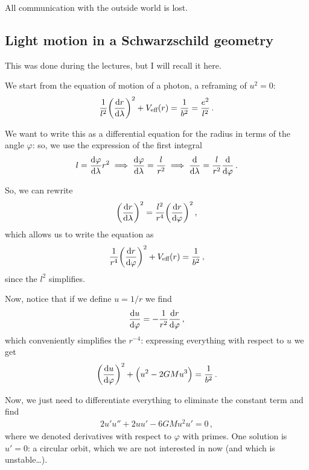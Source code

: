 \documentclass[main.tex]{subfiles}
\begin{document}
All communication with the outside world is lost. 

\subsection{Light motion in a Schwarzschild geometry}

This was done during the lectures, but I will recall it here. 

We start from the equation of motion of a photon, a reframing of \(u^2=0\): 
%
\begin{align}
  \frac{1}{l^2} \qty(\dv{r}{\lambda })^2 + V _{\text{eff}} (r) = \frac{1}{b^2} = \frac{e^2}{l^2}
\,.
\end{align}

We want to write this as a differential equation for the radius in terms of the angle \(\varphi \): so, we use the expression of the first integral 
%
\begin{align}
  l = \dv{\varphi }{\lambda } r^2 \implies \dv{\varphi }{\lambda } = \frac{l}{r^2} \implies \dv{}{\lambda } = \frac{l}{r^2} \dv{}{\varphi }
\,.
\end{align}
%

So, we can rewrite 
%
\begin{align}
  \qty(\dv{r}{\lambda })^2= \frac{l^2}{r^{4}} \qty(\dv{r}{\varphi })^2
\,,
\end{align}
%
which allows us to write the equation as 
%
\begin{align}
  \frac{1}{r^{4}} \qty(\dv{r}{\varphi })^2 + V _{\text{eff}}(r) = \frac{1}{b^2}
\,,
\end{align}
%
since the \(l^2\) simplifies. 

Now, notice that if we define \(u = 1/r\) we find
%
\begin{align}
  \dv{u}{\varphi } = - \frac{1}{r^2} \dv{r}{\varphi }
\,,
\end{align}
%
which conveniently simplifies the \(r^{-4}\): expressing everything with respect to \(u\) we get 
%
\begin{align}
  \qty(\dv{u}{\varphi })^2 +  \qty(u^2-2GMu^3) = \frac{1}{b^2}
\,.
\end{align}

Now, we just need to differentiate everything to eliminate the constant term and find 
%
\begin{align}
  2 u' u'' + 2 u u' - 6 GM u^2 u' = 0
\,,
\end{align}
%
where we denoted derivatives with respect to \(\varphi \) with primes.
One solution is \(u'=0\): a circular orbit, which we are not interested in now (and which is unstable\dots).
\end{document}
